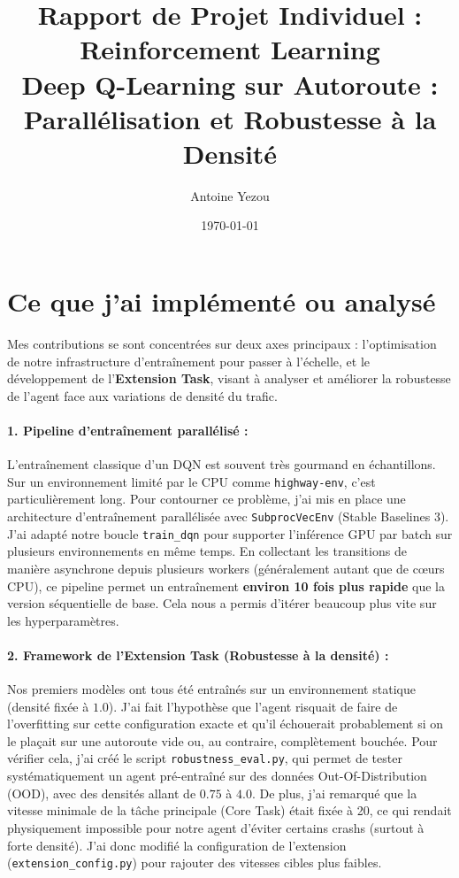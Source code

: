\documentclass[11pt,a4paper]{article}
\title{
    \vspace{-2cm}
    \textbf{Rapport de Projet Individuel : Reinforcement Learning}\\
    \Large Deep Q-Learning sur Autoroute : Parallélisation et Robustesse à la Densité
}
\author{Antoine Yezou}
\date{\today}
\begin{document}
\maketitle

\section{Ce que j'ai implémenté ou analysé}

Mes contributions se sont concentrées sur deux axes principaux : l'optimisation de notre infrastructure d'entraînement pour passer à l'échelle, et le développement de l'\textbf{Extension Task}, visant à analyser et améliorer la robustesse de l'agent face aux variations de densité du trafic.

\paragraph{1. Pipeline d'entraînement parallélisé :} 
L'entraînement classique d'un DQN est souvent très gourmand en échantillons. Sur un environnement limité par le CPU comme \texttt{highway-env}, c'est particulièrement long. Pour contourner ce problème, j'ai mis en place une architecture d'entraînement parallélisée avec \texttt{SubprocVecEnv} (Stable Baselines 3). J'ai adapté notre boucle \texttt{train\_dqn} pour supporter l'inférence GPU par batch sur plusieurs environnements en même temps. En collectant les transitions de manière asynchrone depuis plusieurs workers (généralement autant que de cœurs CPU), ce pipeline permet un entraînement \textbf{environ 10 fois plus rapide} que la version séquentielle de base. Cela nous a permis d'itérer beaucoup plus vite sur les hyperparamètres.

\paragraph{2. Framework de l'Extension Task (Robustesse à la densité) :} 
Nos premiers modèles ont tous été entraînés sur un environnement statique (densité fixée à $1.0$). J'ai fait l'hypothèse que l'agent risquait de faire de l'overfitting sur cette configuration exacte et qu'il échouerait probablement si on le plaçait sur une autoroute vide ou, au contraire, complètement bouchée. Pour vérifier cela, j'ai créé le script \texttt{robustness\_eval.py}, qui permet de tester systématiquement un agent pré-entraîné sur des données Out-Of-Distribution (OOD), avec des densités allant de $0.75$ à $4.0$. De plus, j'ai remarqué que la vitesse minimale de la tâche principale (Core Task) était fixée à 20, ce qui rendait physiquement impossible pour notre agent d'éviter certains crashs (surtout à forte densité). J'ai donc modifié la configuration de l'extension (\texttt{extension\_config.py}) pour rajouter des vitesses cibles plus faibles.
\end{document}

